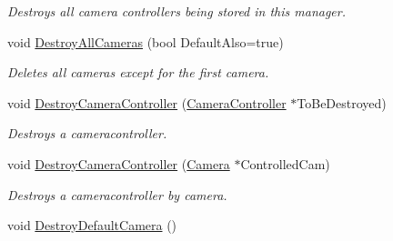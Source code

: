 \begin{DoxyCompactItemize}
\begin{DoxyCompactList}\small\item\em Destroys all camera controllers being stored in this manager. \item\end{DoxyCompactList}\item 
void \hyperlink{classMezzanine_1_1CameraManager_a4c8458f99cc04c5103aa8468624514f7}{DestroyAllCameras} (bool DefaultAlso=true)
\begin{DoxyCompactList}\small\item\em Deletes all cameras except for the first camera. \item\end{DoxyCompactList}\item 
void \hyperlink{classMezzanine_1_1CameraManager_a783a0e59b710c03e2a8340e5769fe8aa}{DestroyCameraController} (\hyperlink{classMezzanine_1_1CameraController}{CameraController} $\ast$ToBeDestroyed)
\begin{DoxyCompactList}\small\item\em Destroys a cameracontroller. \item\end{DoxyCompactList}\item 
void \hyperlink{classMezzanine_1_1CameraManager_ab8978a1ff77cb4019d90bf058dfdd4fc}{DestroyCameraController} (\hyperlink{classMezzanine_1_1Camera}{Camera} $\ast$ControlledCam)
\begin{DoxyCompactList}\small\item\em Destroys a cameracontroller by camera. \item\end{DoxyCompactList}\item 
\hypertarget{classMezzanine_1_1CameraManager_a01dcbdb44f681f7915a5347ef167b13f}{
void \hyperlink{classMezzanine_1_1CameraManager_a01dcbdb44f681f7915a5347ef167b13f}{DestroyDefaultCamera} ()}
\label{classMezzanine_1_1CameraManager_a01dcbdb44f681f7915a5347ef167b13f}


\end{DoxyCompactItemize}
